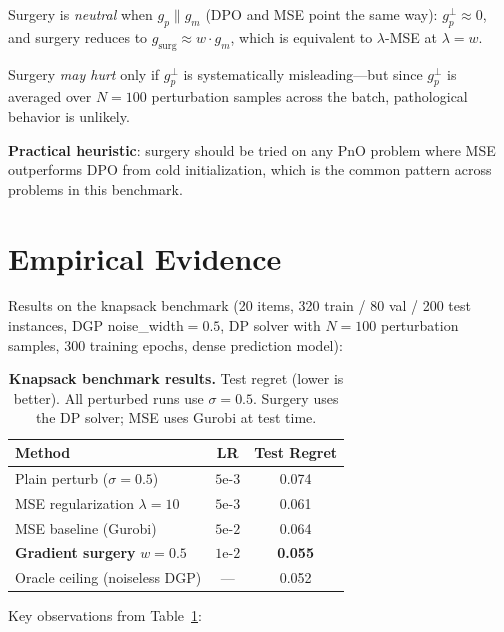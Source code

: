 \documentclass[11pt]{article}
\begin{document}
Surgery is \emph{neutral} when $g_p \parallel g_m$ (DPO and MSE point the same
way): $g_p^{\perp} \approx 0$, and surgery reduces to
$g_{\mathrm{surg}} \approx w \cdot g_m$, which is equivalent to $\lambda$-MSE at
$\lambda = w$.

Surgery \emph{may hurt} only if $g_p^{\perp}$ is systematically misleading---but
since $g_p^{\perp}$ is averaged over $N = 100$ perturbation samples across the
batch, pathological behavior is unlikely.

\textbf{Practical heuristic}: surgery should be tried on any PnO problem where
MSE outperforms DPO from cold initialization, which is the common pattern across
problems in this benchmark.

\section{Empirical Evidence}

Results on the knapsack benchmark (20 items, 320 train / 80 val / 200 test
instances, DGP noise\_width$= 0.5$, DP solver with $N = 100$ perturbation samples,
300 training epochs, dense prediction model):

\begin{table}[h]
  \centering
  \caption{\textbf{Knapsack benchmark results.}
    Test regret (lower is better).  All perturbed runs use $\sigma = 0.5$.
    Surgery uses the DP solver; MSE uses Gurobi at test time.}
  \label{tab:results}
  \begin{tabular}{lcc}
    \toprule
    Method & LR & Test Regret \\
    \midrule
    Plain perturb ($\sigma = 0.5$)              & $5\text{e-}3$ & 0.074 \\
    MSE regularization $\lambda = 10$           & $5\text{e-}3$ & 0.061 \\
    MSE baseline (Gurobi)                       & $5\text{e-}2$ & 0.064 \\
    \textbf{Gradient surgery} $w = 0.5$         & $1\text{e-}2$ & \textbf{0.055} \\
    Oracle ceiling (noiseless DGP)              & ---           & 0.052 \\
    \bottomrule
  \end{tabular}
\end{table}

Key observations from Table~\ref{tab:results}:
\end{document}
